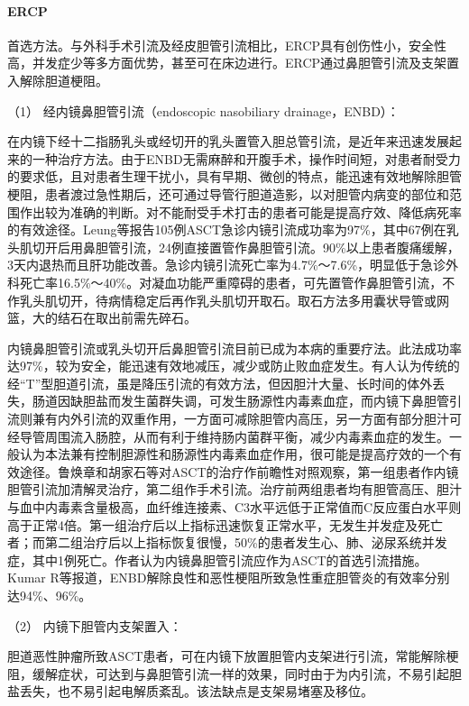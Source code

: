 \paragraph{ERCP}

首选方法。与外科手术引流及经皮胆管引流相比，ERCP具有创伤性小，安全性高，并发症少等多方面优势，甚至可在床边进行。ERCP通过鼻胆管引流及支架置入解除胆道梗阻。

\hypertarget{text00322.htmlux5cux23CHP11-4-3-2-1-1-1}{}
（1） 经内镜鼻胆管引流（endoscopic nasobiliary drainage，ENBD）：

在内镜下经十二指肠乳头或经切开的乳头置管入胆总管引流，是近年来迅速发展起来的一种治疗方法。由于ENBD无需麻醉和开腹手术，操作时间短，对患者耐受力的要求低，且对患者生理干扰小，具有早期、微创的特点，能迅速有效地解除胆管梗阻，患者渡过急性期后，还可通过导管行胆道造影，以对胆管内病变的部位和范围作出较为准确的判断。对不能耐受手术打击的患者可能是提高疗效、降低病死率的有效途径。Leung等报告105例ASCT急诊内镜引流成功率为97\%，其中67例在乳头肌切开后用鼻胆管引流，24例直接置管作鼻胆管引流。90\%以上患者腹痛缓解，3天内退热而且肝功能改善。急诊内镜引流死亡率为4.7\%～7.6\%，明显低于急诊外科死亡率16.5\%～40\%。对凝血功能严重障碍的患者，可先置管作鼻胆管引流，不作乳头肌切开，待病情稳定后再作乳头肌切开取石。取石方法多用囊状导管或网篮，大的结石在取出前需先碎石。

内镜鼻胆管引流或乳头切开后鼻胆管引流目前已成为本病的重要疗法。此法成功率达97\%，较为安全，能迅速有效地减压，减少或防止败血症发生。有人认为传统的经“T”型胆道引流，虽是降压引流的有效方法，但因胆汁大量、长时间的体外丢失，肠道因缺胆盐而发生菌群失调，可发生肠源性内毒素血症，而内镜下鼻胆管引流则兼有内外引流的双重作用，一方面可减除胆管内高压，另一方面有部分胆汁可经导管周围流入肠腔，从而有利于维持肠内菌群平衡，减少内毒素血症的发生。一般认为本法兼有控制胆源性和肠源性内毒素血症作用，很可能是提高疗效的一个有效途径。鲁焕章和胡家石等对ASCT的治疗作前瞻性对照观察，第一组患者作内镜胆管引流加清解灵治疗，第二组作手术引流。治疗前两组患者均有胆管高压、胆汁与血中内毒素含量极高，血纤维连接素、C3水平远低于正常值而C反应蛋白水平则高于正常4倍。第一组治疗后以上指标迅速恢复正常水平，无发生并发症及死亡者；而第二组治疗后以上指标恢复很慢，50\%的患者发生心、肺、泌尿系统并发症，其中1例死亡。作者认为内镜鼻胆管引流应作为ASCT的首选引流措施。Kumar
R等报道，ENBD解除良性和恶性梗阻所致急性重症胆管炎的有效率分别达94\%、96\%。

\hypertarget{text00322.htmlux5cux23CHP11-4-3-2-1-1-2}{}
（2） 内镜下胆管内支架置入：

胆道恶性肿瘤所致ASCT患者，可在内镜下放置胆管内支架进行引流，常能解除梗阻，缓解症状，可达到与鼻胆管引流一样的效果，同时由于为内引流，不易引起胆盐丢失，也不易引起电解质紊乱。该法缺点是支架易堵塞及移位。


